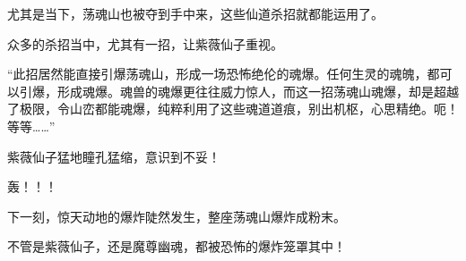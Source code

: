 \begin{this_body}
尤其是当下，荡魂山也被夺到手中来，这些仙道杀招就都能运用了。

众多的杀招当中，尤其有一招，让紫薇仙子重视。

“此招居然能直接引爆荡魂山，形成一场恐怖绝伦的魂爆。任何生灵的魂魄，都可以引爆，形成魂爆。魂兽的魂爆更往往威力惊人，而这一招荡魂山魂爆，却是超越了极限，令山峦都能魂爆，纯粹利用了这些魂道道痕，别出机枢，心思精绝。呃！等等……”

紫薇仙子猛地瞳孔猛缩，意识到不妥！

轰！！！

下一刻，惊天动地的爆炸陡然发生，整座荡魂山爆炸成粉末。

不管是紫薇仙子，还是魔尊幽魂，都被恐怖的爆炸笼罩其中！

\end{this_body}

